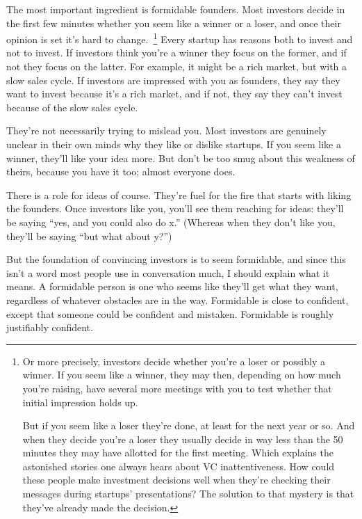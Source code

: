 \documentclass[12pt]{book}
\begin{document}
The most important ingredient is formidable founders. Most investors
decide in the first few minutes whether you seem like a winner or a
loser, and once their opinion is set it's hard to
change.~\footnote{Or more precisely, investors decide whether you're a loser or
possibly a winner. If you seem like a winner, they may then, depending
on how much you're raising, have several more meetings with you to test
whether that initial impression holds up.

But if you seem like a loser they're done, at least for the next year or
so. And when they decide you're a loser they usually decide in way less
than the 50 minutes they may have allotted for the first meeting. Which
explains the astonished stories one always hears about VC
inattentiveness. How could these people make investment decisions well
when they're checking their messages during startups' presentations? The
solution to that mystery is that they've already made the decision.} Every startup has reasons both to invest
and not to invest. If investors think you're a winner they focus on the
former, and if not they focus on the latter. For example, it might be a
rich market, but with a slow sales cycle. If investors are impressed
with you as founders, they say they want to invest because it's a rich
market, and if not, they say they can't invest because of the slow sales
cycle.

They're not necessarily trying to mislead you. Most investors are
genuinely unclear in their own minds why they like or dislike startups.
If you seem like a winner, they'll like your idea more. But don't be too
smug about this weakness of theirs, because you have it too; almost
everyone does.

There is a role for ideas of course. They're fuel for the fire that
starts with liking the founders. Once investors like you, you'll see
them reaching for ideas: they'll be saying ``yes, and you could also do
x.'' (Whereas when they don't like you, they'll be saying ``but what
about y?'')

But the foundation of convincing investors is to seem formidable, and
since this isn't a word most people use in conversation much, I should
explain what it means. A formidable person is one who seems like they'll
get what they want, regardless of whatever obstacles are in the way.
Formidable is close to confident, except that someone could be confident
and mistaken. Formidable is roughly justifiably confident.
\end{document}
